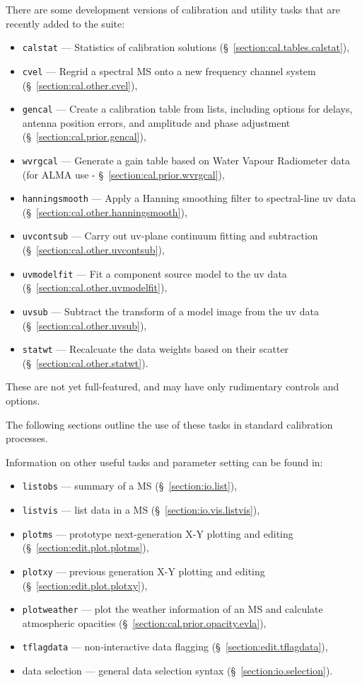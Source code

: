 There are some development versions of calibration and utility
tasks that are recently added to the suite:
\begin{itemize}
   \item {\tt calstat} --- Statistics of calibration solutions 
      (\S~\ref{section:cal.tables.calstat}),
   \item {\tt cvel} --- Regrid a spectral MS onto a new frequency
      channel system
      (\S~\ref{section:cal.other.cvel}),
   \item {\tt gencal} --- Create a calibration table from lists,
      including options for delays, antenna position errors, and 
      amplitude and phase adjustment
      (\S~\ref{section:cal.prior.gencal}),
   \item {\tt wvrgcal} --- Generate a gain table based on Water Vapour
     Radiometer data (for ALMA use - \S~\ref{section:cal.prior.wvrgcal}),
   \item {\tt hanningsmooth} --- Apply a Hanning smoothing filter to
      spectral-line uv data
      (\S~\ref{section:cal.other.hanningsmooth}),
   \item {\tt uvcontsub} --- Carry out uv-plane continuum fitting and subtraction 
      (\S~\ref{section:cal.other.uvcontsub}),
   \item {\tt uvmodelfit} --- Fit a component source model to
     the uv data (\S~\ref{section:cal.other.uvmodelfit}),
   \item {\tt uvsub} --- Subtract the transform of a model image from
     the uv data (\S~\ref{section:cal.other.uvsub}),
   \item {\tt statwt} --- Recalcuate the data weights based on their
     scatter (\S~\ref{section:cal.other.statwt}).  
\end{itemize}
These are not yet full-featured, and may have only rudimentary
controls and options.

The following sections outline the use of these tasks in standard calibration
processes.

Information on other useful tasks and parameter setting can be found in:
\begin{itemize}
   \item {\tt listobs} --- summary of a MS (\S~\ref{section:io.list}),
   \item {\tt listvis} --- list data in a MS (\S~\ref{section:io.vis.listvis}),
   \item {\tt plotms} --- prototype next-generation X-Y plotting and editing 
      (\S~\ref{section:edit.plot.plotms}),
   \item {\tt plotxy} --- previous generation X-Y plotting and editing 
      (\S~\ref{section:edit.plot.plotxy}),
    \item {\tt plotweather} --- plot the weather information of an MS
      and calculate atmospheric opacities (\S~\ref{section:cal.prior.opacity.evla}),
   \item {\tt tflagdata} --- non-interactive data flagging
      (\S~\ref{section:edit.tflagdata}),
   \item data selection --- general data selection syntax
      (\S~\ref{section:io.selection}).
\end{itemize}

